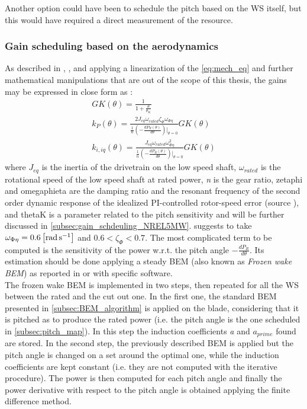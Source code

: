 Another option could have been to schedule the pitch based on the \acrshort{WS} itself, but this would have required a direct measurement of the resource. 
\subsubsection{Gain scheduling based on the aerodynamics}\label{subsec:gain_schdeuling_aero}

As described in \cite{Aerodynamics_of_wind_turbines}, \cite{NREL_5MW_reference}, and \cite{ris_r_1500} applying a linearization of the \autoref{eq:mech_eq} and further mathematical manipulations that are out of the scope of this thesis,  the gains may be expressed in close form as :
\begin{gather}
    GK(\theta) = \frac{1}{1+\frac{\theta}{\theta_K}} \label{eq:GK}\\
    k_P(\theta) = \frac{2J_{eq}\omega_{rated}\zeta_{\Phi}\omega_{\Phi\eta}}{\frac{1}{n}\left(-\frac{dP_R(\theta)}{d\theta}\right)\vert_{\theta=0}}GK(\theta)
    \label{eq:kp}\\
    k_{i,iq}(\theta) = \frac{J_{eq}\omega_{rated}\omega_{\Phi\eta}^2}{\frac{1}{n}\left(-\frac{dP_R(\theta)}{d\theta}\right)\vert_{\theta=0}}GK(\theta)
    \label{eq:ki}
\end{gather}
where $J_{eq}$ is the inertia of the drivetrain on the low speed shaft, $\omega_{rated}$ is the rotational speed of the low speed shaft at rated power, \textit{n} is the gear ratio, \acrshort{zetaphi} and \acrshort{omegaphieta} are the damping ratio and the resonant frequency of the second order dynamic response of the idealized PI-controlled rotor-speed error (source \cite{NREL_5MW_reference}), and \acrshort{thetaK} is a parameter related to the pitch sensitivity and will be further discussed in \autoref{subsec:gain_schdeuling_NREL5MW}. \cite{NREL_5MW_reference} suggests to take $\omega_{\Phi\eta}=0.6\left[\si{\radian\per\second}\right]$ and $0.6<\zeta_{\Phi}<0.7$. The most complicated term to be computed is the sensitivity of the power w.r.t. the pitch angle $-\frac{dP_R}{d\theta}$. Its estimation should be done applying a steady \acrshort{BEM} (also known as \textit{Frozen wake BEM}) as reported in \cite{Aerodynamics_of_wind_turbines} or with specific software. \\
The frozen wake BEM is implemented in two steps, then repeated for all the \acrshort{WS} between the rated and the cut out one. In the first one, the standard BEM presented in \autoref{subsec:BEM_algorithm} is applied on the blade, considering that it is pitched as to produce the rated power (i.e. the pitch angle is the one scheduled in \autoref{subsec:pitch_map}). In this step the induction coefficients \textit{a} and \textit{$a_{prime}$} found are stored. In the second step, the previously described BEM is applied but the pitch angle is changed on a set around the optimal one, while the induction coefficients are kept constant (i.e. they are not computed with the iterative procedure). The power is then computed for each pitch angle and finally the power derivative with respect to the pitch angle is obtained applying the finite difference method.


